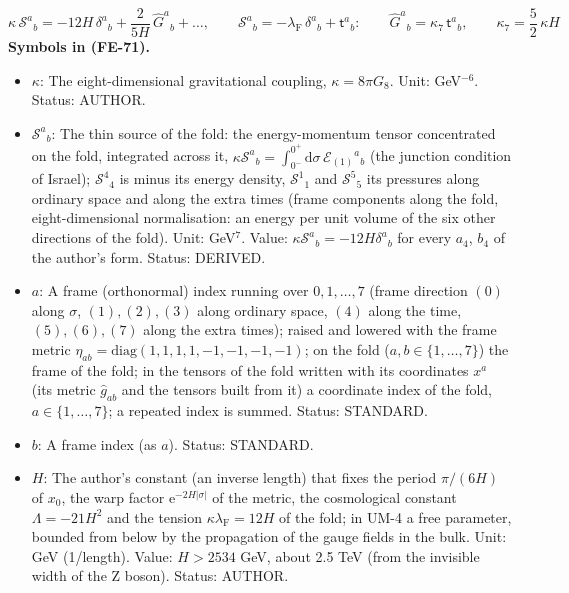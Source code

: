 \documentclass[
  10pt,
]{article}
\providecommand{\tightlist}{%
  \setlength{\itemsep}{0pt}\setlength{\parskip}{0pt}}
\begin{document}
\[
\kappa\,\mathcal{S}^a{}_b = -12H\,\delta^a{}_b + \frac{2}{5H}\,\hat G^a{}_b + \dots,\qquad
\mathcal{S}^a{}_b = -\lambda_{\mathrm{F}}\,\delta^a{}_b + \mathsf{t}^a{}_b:\qquad
\hat G^a{}_b = \kappa_7\,\mathsf{t}^a{}_b,\qquad \kappa_7 = \frac52\,\kappa H \tag{FE-71}
\] \textbf{Symbols in (FE-71).}

\begin{itemize}
\tightlist
\item
  \(\kappa\): The eight-dimensional gravitational coupling,
  \(\kappa = 8\pi G_8\). Unit: GeV\(^{-6}\). Status: AUTHOR.
\item
  \(\mathcal{S}^a{}_b\): The thin source of the fold: the
  energy-momentum tensor concentrated on the fold, integrated across it,
  \(\kappa\mathcal{S}^a{}_b = \int_{0^-}^{0^+}\mathrm{d}\sigma\,\mathcal{E}_{(1)}{}^a{}_b\)
  (the junction condition of Israel); \(\mathcal{S}^4{}_4\) is minus its
  energy density, \(\mathcal{S}^1{}_1\) and \(\mathcal{S}^5{}_5\) its
  pressures along ordinary space and along the extra times (frame
  components along the fold, eight-dimensional normalisation: an energy
  per unit volume of the six other directions of the fold). Unit:
  GeV\(^7\). Value: \(\kappa\mathcal{S}^a{}_b = -12H\delta^a{}_b\) for
  every \(a_4\), \(b_4\) of the author's form. Status: DERIVED.
\item
  \(a\): A frame (orthonormal) index running over \(0, 1, \dots, 7\)
  (frame direction \((0)\) along \(\sigma\), \((1), (2), (3)\) along
  ordinary space, \((4)\) along the time, \((5), (6), (7)\) along the
  extra times); raised and lowered with the frame metric
  \(\eta_{ab} = \mathrm{diag}(1, 1, 1, 1, -1, -1, -1, -1)\); on the fold
  (\(a, b \in \{1, \dots, 7\}\)) the frame of the fold; in the tensors
  of the fold written with its coordinates \(x^a\) (its metric
  \(\hat g_{ab}\) and the tensors built from it) a coordinate index of
  the fold, \(a \in \{1, \dots, 7\}\); a repeated index is summed.
  Status: STANDARD.
\item
  \(b\): A frame index (as \(a\)). Status: STANDARD.
\item
  \(H\): The author's constant (an inverse length) that fixes the period
  \(\pi/(6H)\) of \(x_0\), the warp factor
  \(\mathrm{e}^{-2H\lvert\sigma\rvert}\) of the metric, the cosmological
  constant \(\Lambda = -21H^2\) and the tension
  \(\kappa\lambda_{\mathrm{F}} = 12H\) of the fold; in UM-4 a free
  parameter, bounded from below by the propagation of the gauge fields
  in the bulk. Unit: GeV (1/length). Value: \(H > 2534\) GeV, about 2.5
  TeV (from the invisible width of the Z boson). Status: AUTHOR.

\end{itemize}
\end{document}

